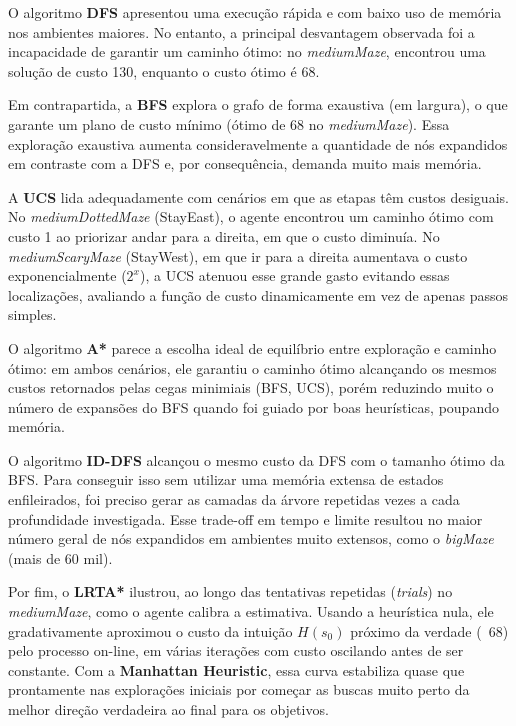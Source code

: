 \documentclass[a4paper,11pt]{article}
\begin{document}
O algoritmo \textbf{DFS} apresentou uma execução rápida e com baixo uso de memória nos ambientes maiores. No entanto, a principal desvantagem observada foi a incapacidade de garantir um caminho ótimo: no \textit{mediumMaze}, encontrou uma solução de custo 130, enquanto o custo ótimo é 68. 

Em contrapartida, a \textbf{BFS} explora o grafo de forma exaustiva (em largura), o que garante um plano de custo mínimo (ótimo de 68 no \textit{mediumMaze}). Essa exploração exaustiva aumenta consideravelmente a quantidade de nós expandidos em contraste com a DFS e, por consequência, demanda muito mais memória.

A \textbf{UCS} lida adequadamente com cenários em que as etapas têm custos desiguais. No \textit{mediumDottedMaze} (StayEast), o agente encontrou um caminho ótimo com custo 1 ao priorizar andar para a direita, em que o custo diminuía. No \textit{mediumScaryMaze} (StayWest), em que ir para a direita aumentava o custo exponencialmente ($2^x$), a UCS atenuou esse grande gasto evitando essas localizações, avaliando a função de custo dinamicamente em vez de apenas passos simples.

O algoritmo \textbf{A*} parece a escolha ideal de equilíbrio entre exploração e caminho ótimo: em ambos cenários, ele garantiu o caminho ótimo alcançando os mesmos custos retornados pelas cegas minimiais (BFS, UCS), porém reduzindo muito o número de expansões do BFS quando foi guiado por boas heurísticas, poupando memória.

O algoritmo \textbf{ID-DFS} alcançou o mesmo custo da DFS com o tamanho ótimo da BFS. Para conseguir isso sem utilizar uma memória extensa de estados enfileirados, foi preciso gerar as camadas da árvore repetidas vezes a cada profundidade investigada. Esse trade-off em tempo e limite resultou no maior número geral de nós expandidos em ambientes muito extensos, como o \textit{bigMaze} (mais de 60 mil).

Por fim, o \textbf{LRTA*} ilustrou, ao longo das tentativas repetidas (\textit{trials}) no \textit{mediumMaze}, como o agente calibra a estimativa. Usando a heurística nula, ele gradativamente aproximou o custo da intuição $H(s_0)$ próximo da verdade (~68) pelo processo on-line, em várias iterações com custo oscilando antes de ser constante. Com a \textbf{Manhattan Heuristic}, essa curva estabiliza quase que prontamente nas explorações iniciais por começar as buscas muito perto da melhor direção verdadeira ao final para os objetivos.
\end{document}
